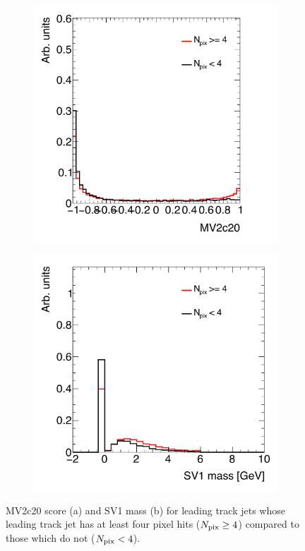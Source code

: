\begin{figure}[h!]
   \begin{subfigure}[t]{0.5\textwidth}
        \centering
        \includegraphics[width=\textwidth]{figures/Nph_MV2c20}
        \caption{}
    \end{subfigure}%
    \begin{subfigure}[t]{0.5\textwidth}
        \centering
        \includegraphics[width=\textwidth]{figures/Nph_SV1mass}
        \caption{}
    \end{subfigure}

   \caption{MV2c20 score (a) and SV1 mass (b) for leading track jets whose leading track jet has at least four pixel hits ($N_{\rm pix} \geq 4$) compared to those which do not ($N_{\rm pix} < 4$).}
  \label{fig:Nph_MV2}
\end{figure}
